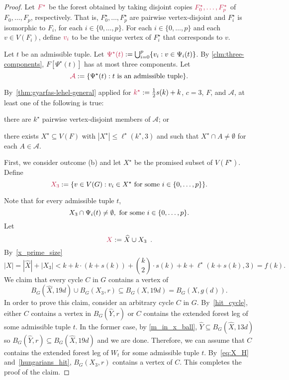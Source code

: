 \documentclass{patmorin}
\DeclarePairedDelimiter\set{\{}{\}}
\begin{document}
\begin{proof}
Let $\mathdefin{F^{\star}}$ be the forest obtained by taking 
disjoint copies $\mathdefin{F_0^\star,\ldots, F_p^\star}$ of $F_0,\ldots, F_p$, respectively.  That is,  $F_0^\star,\ldots, F_p^\star$ are pairwise vertex-disjoint and $F_i^\star$ is isomorphic to $F_i$, for each $i\in\{0,\ldots,p\}$.
For each $i\in\{0,\ldots,p\}$ and each $v\in V(F_i)$, define $\mathdefin{v_i}$ to be the unique vertex of $F^\star_i$ that corresponds to $v$.

Let $t$ be an admissible tuple. 
Let $\mathdefin{\Psi^\star(t)}:=\bigcup_{i=0}^p \{v_i:v\in \Psi_i(t)\}$.
By \cref{clm:three-components}, $F[\Psi^\star(t)]$ has at most three components. 
Let
\[
\mathdefin{\mathcal{A}}:=\{\Psi^\star(t):\text{$t$ is an admissible tuple}\}.
\]

By~\cref{thm:gyarfas-lehel-general} applied for
$\mathdefin{k^\star}:=\tfrac{1}{2}s(k)+k$, $c=3$, $F$, and $\mathcal{A}$, at least one of the following is true:
\begin{enumerate*}[label=(\alph*),ref=\alph*]
  \item there are $k^\star$ pairwise vertex-disjoint members of $\mathcal{A}$; or 
  \item there exists $X^\star\subseteq V(F)$ with $|X^\star|\leq \ell^\star(k^\star,3)$ and such that $X^\star \cap A\neq\emptyset$ for each $A\in \mathcal{A}$.
\end{enumerate*}

First, we consider outcome (b) and let $X^\star$ be the promised subset of $V(F^\star)$.
Define 
\[
\mathdefin{X_3}:=\set{v\in V(G):v_i\in X^\star \textrm{ for some $i\in\set{0,\ldots,p}$}}.
\]


Note that 
for every admissible tuple $t$,
\begin{equation}\label{eq:X_H}
X_3 \cap \Psi_i(t) \neq\emptyset,\ \textrm{for some $i\in\set{0,\ldots,p}$.}
\end{equation}
Let
\[
\mathdefin{X}:=\widehat{X} \cup X_3 \enspace .
\]
By~\eqref{x_prime_size}
\[
|X| = |\widehat{X}| + |X_3| < \textstyle k + k\cdot (k+s(k)) + \binom{k}{2}\cdot s(k) + k + \ell^\star(k+s(k),3) = f(k).
\]
We claim that every cycle $C$ in $G$ contains a vertex of 
\[
B_G(\widehat{X},19d)\cup B_G(X_3,r)\subseteq B_G(X,19d) = B_G(X,g(d)).
\]
In order to prove this claim, consider an arbitrary cycle $C$ in $G$. 
By~\cref{hit_cycle}, either $C$ contains a vertex in $B_G(\widehat{Y},r)$ or $C$ contains the extended forest leg of some admissible tuple $t$. 
In the former case, by \eqref{m_in_x_ball}, $\widehat{Y}\subseteq B_G(\widehat{X},13d)$ so $B_G(\widehat{Y},r)\subseteq B_G(\widehat{X},19d)$  and we are done. 
Therefore, we can assume that $C$ contains the extended forest leg of $W_t$ for some admissible tuple $t$. 
By~\eqref{eq:X_H} and~\cref{hungarians_hit}, 
$B_G(X_3,r)$ contains a vertex of $C$.
This completes the proof of the claim.


\end{proof}
\end{document}
